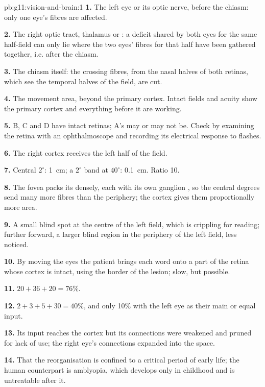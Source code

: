 \begin{solution}{pb:g11:vision-and-brain:1}
\textbf{1.} The left eye or its optic nerve, before the chiasm: only
one eye's fibres are affected.

\textbf{2.} The right optic tract, thalamus or : a deficit
shared by both eyes for the same half-field can only lie where the
two eyes' fibres for that half have been gathered together, i.e.
after the chiasm.

\textbf{3.} The chiasm itself: the crossing fibres, from the nasal
halves of both retinas, which see the temporal halves of the field,
are cut.

\textbf{4.} The movement area, beyond the primary cortex. Intact
fields and acuity show the primary cortex and everything before it
are working.

\textbf{5.} B, C and D have intact retinas; A's may or may not be.
Check by examining the retina with an ophthalmoscope and recording
its electrical response to flashes.

\textbf{6.} The right cortex receives the left half of the field.

\textbf{7.} Central $2^\circ$: \qty{1}{cm}; a $2^\circ$ band at
$40^\circ$: \qty{0.1}{cm}. Ratio 10.

\textbf{8.} The fovea packs its  densely, each with its own
ganglion , so the central degrees send many more fibres than the
periphery; the cortex gives them proportionally more area.

\textbf{9.} A small blind spot at the centre of the left field, which
is crippling for reading; further forward, a larger blind region in
the periphery of the left field, less noticed.

\textbf{10.} By moving the eyes the patient brings each word onto a
part of the retina whose cortex is intact, using the border of the
lesion; slow, but possible.

\textbf{11.} $20 + 36 + 20 = 76\%$.

\textbf{12.} $2 + 3 + 5 + 30 = 40\%$, and only 10\% with the left eye
as their main or equal input.

\textbf{13.} Its input reaches the cortex but its connections were
weakened and pruned for lack of use; the right eye's connections
expanded into the space.

\textbf{14.} That the reorganisation is confined to a critical period
of early life; the human counterpart is amblyopia, which develops only
in childhood and is untreatable after it.


\end{solution}
